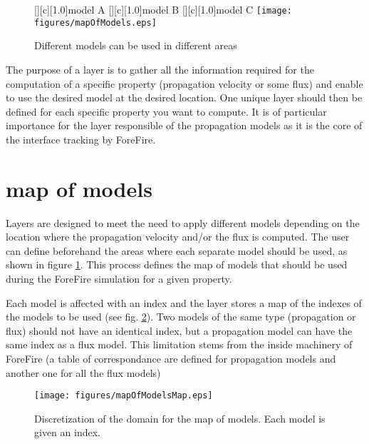 \begin{figure}[!h]
[][c][1.0]{model A}
[][c][1.0]{model B}
[][c][1.0]{model C}
\centering
\texttt{[image: figures/mapOfModels.eps]}
\caption{Different models can be used in different areas\label{fig:map}}
\end{figure}

The purpose of a layer is to gather all the information required for the computation of a specific property (propagation velocity or some flux) and enable to use the desired model at the desired location. One unique layer should then be defined for each specific property you want to compute. It is of particular importance for the layer responsible of the propagation models as it is the core of the interface tracking by ForeFire.

\begin{center}
\end{center}

\section{map of models}

Layers are designed to meet the need to apply different models depending on the location where the propagation velocity and/or the flux is computed. The user can define beforehand the areas where each separate model should be used, as shown in figure \ref{fig:map}. This process defines the map of models that should be used during the ForeFire simulation for a given property.

Each model is affected with an index and the layer stores a map of the indexes of the models to be used (see fig. \ref{fig:indexmap}). Two models of the same type (propagation or flux) should not have an identical index, but a propagation model can have the same index as a flux model. This limitation stems from the inside machinery of ForeFire (a table of correspondance are defined for propagation models and another one for all the flux models)

\begin{figure}[!h]
\centering
\texttt{[image: figures/mapOfModelsMap.eps]}
\caption{Discretization of the domain for the map of models. Each model is given an index.\label{fig:indexmap}}
\end{figure}

